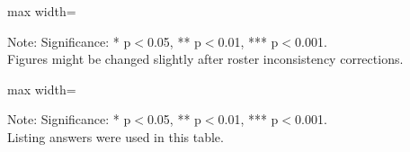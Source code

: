 \documentclass[11pt,harvard]{article}
\begin{document}
\begin{table}[htbp]
	\centering
	\begin{adjustbox}{max width=\textwidth}
		\begin{threeparttable}
			\caption{Ecuador Sample Balance Table}
			\scriptsize
			 
			\label{tab:Ecuador_Modality_Demo_Balance}
			\begin{tablenotes}
				\item Note: Significance: * p$<$0.05, ** p$<$0.01, *** p$<$0.001. \\
						 Figures might be changed slightly after roster inconsistency corrections.
			\end{tablenotes}
		\end{threeparttable}
	\end{adjustbox}
\end{table}

	\begin{table}[htbp]
	\centering
	\begin{adjustbox}{max width=\textwidth}
		\begin{threeparttable}
			\caption{CAR Sample Balance Table}
			\scriptsize
			 
			\label{tab:CAR_Modality_Own_Phone_Demo_Balance}
			\begin{tablenotes}
				\item Note: Significance: * p$<$0.05, ** p$<$0.01, *** p$<$0.001. \\
						 Listing answers were used in this table.
			\end{tablenotes}
		\end{threeparttable}
	\end{adjustbox}
\end{table}
\end{document}
